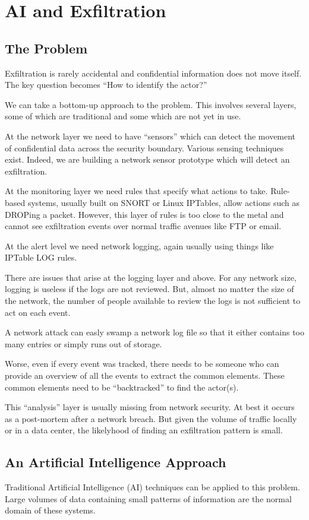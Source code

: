 \chapter{AI and Exfiltration}
\section{The Problem}
Exfiltration is rarely accidental and confidential information does
not move itself. The key question becomes ``How to identify the actor?''

We can take a bottom-up approach to the problem. This involves several
layers, some of which are traditional and some which are not yet in use.

At the network layer we need to have ``sensors'' which can detect the
movement of confidential data across the security boundary. Various
sensing techniques exist. Indeed, we are building a network sensor
prototype which will detect an exfiltration.

At the monitoring layer we need rules that specify what actions to take.
Rule-based systems, usually built on SNORT or Linux IPTables,
allow actions such as DROPing a packet. However, this layer of rules is
too close to the metal and cannot see exfiltration events over normal
traffic avenues like FTP or email.

At the alert level we need network logging, again usually using things
like IPTable LOG rules.

There are issues that arise at the logging layer and above. 
For any network size, logging is useless if the logs are not reviewed.
But, almost no matter the size of the network, the number of people
available to review the logs is not sufficient to act on each event.

A network attack can easly swamp a network log file so that it either
contains too many entries or simply runs out of storage.

Worse, even if every event was tracked, there needs to be someone who
can provide an overview of all the events to extract the common elements.
These common elements need to be ``backtracked'' to find the actor(s).

This ``analysis'' layer is usually missing from network security.
At best it occurs as a post-mortem after a network breach. But given
the volume of traffic locally or in a data center, the likelyhood of
finding an exfiltration pattern is small.

\section{An Artificial Intelligence Approach}
Traditional Artificial Intelligence (AI) techniques can be applied to this
problem. Large volumes of data containing small patterns of information
are the normal domain of these systems. 

